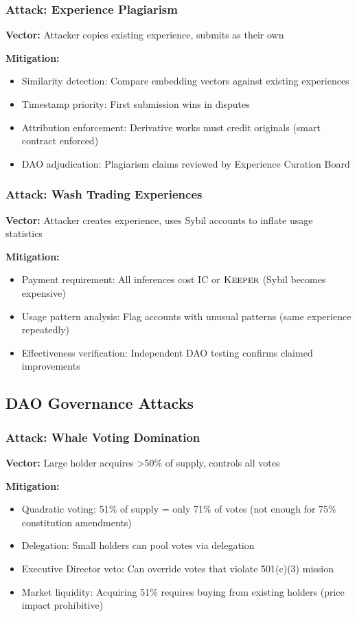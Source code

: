 \subsubsection{Attack: Experience Plagiarism}

\textbf{Vector:} Attacker copies existing experience, submits as their own

\textbf{Mitigation:}
\begin{itemize}
\item Similarity detection: Compare embedding vectors against existing experiences
\item Timestamp priority: First submission wins in disputes
\item Attribution enforcement: Derivative works must credit originals (smart contract enforced)
\item DAO adjudication: Plagiarism claims reviewed by Experience Curation Board
\end{itemize}

\subsubsection{Attack: Wash Trading Experiences}

\textbf{Vector:} Attacker creates experience, uses Sybil accounts to inflate usage statistics

\textbf{Mitigation:}
\begin{itemize}
\item Payment requirement: All inferences cost IC or $\textsc{Keeper}$ (Sybil becomes expensive)
\item Usage pattern analysis: Flag accounts with unusual patterns (same experience repeatedly)
\item Effectiveness verification: Independent DAO testing confirms claimed improvements
\end{itemize}

\subsection{DAO Governance Attacks}

\subsubsection{Attack: Whale Voting Domination}

\textbf{Vector:} Large holder acquires >50\% of supply, controls all votes

\textbf{Mitigation:}
\begin{itemize}
\item Quadratic voting: 51\% of supply = only 71\% of votes (not enough for 75\% constitution amendments)
\item Delegation: Small holders can pool votes via delegation
\item Executive Director veto: Can override votes that violate 501(c)(3) mission
\item Market liquidity: Acquiring 51\% requires buying from existing holders (price impact prohibitive)
\end{itemize}


